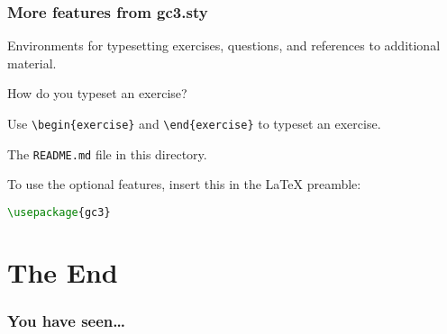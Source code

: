 \documentclass[english,serif,mathserif,usenames,dvipsnames]{beamer}
\begin{document}
\begin{frame}[fragile]
  \frametitle{More features from gc3.sty}

  Environments for typesetting exercises, questions, and references to additional material.

  \begin{question}
    How do you typeset an exercise?
  \end{question}

  \+
  \begin{exercise}
    Use \lstinline|\begin{exercise}| and \lstinline|\end{exercise}| to
    typeset an exercise.
  \end{exercise}

  \begin{seealso}
    The \texttt{README.md} file in this directory.
  \end{seealso}

  \+
  To use the optional features, insert this in the \LaTeX{} preamble:
\begin{lstlisting}[language=tex]
\usepackage{gc3}
\end{lstlisting}
\end{frame}


\section{The End}
\begin{frame}[fragile]
  \frametitle{You have seen\ldots}
  \tableofcontents[sectionstyle=show/shaded]
\end{frame}
\end{document}
